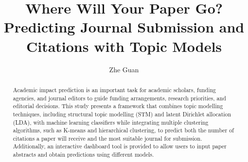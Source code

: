 \documentclass[9pt,twocolumn,twoside]{pnas-new}
\begin{document}
\title{Where Will Your Paper Go? Predicting Journal Submission and Citations with Topic Models}

\author[a,1]{Zhe Guan}






\begin{abstract}

Academic impact prediction is an important task for academic scholars, funding agencies, and journal editors to guide funding arrangements, research priorities, and editorial decisions. This study presents a framework that combines topic modelling techniques, including structural topic modelling (STM) and latent Dirichlet allocation (LDA), with machine learning classifiers while integrating multiple clustering algorithms, such as K-means and hierarchical clustering, to predict both the number of citations a paper will receive and the most suitable journal for submission. Additionally, an interactive dashboard tool is provided to allow users to input paper abstracts and obtain predictions using different models.

\end{abstract}
\end{document}
